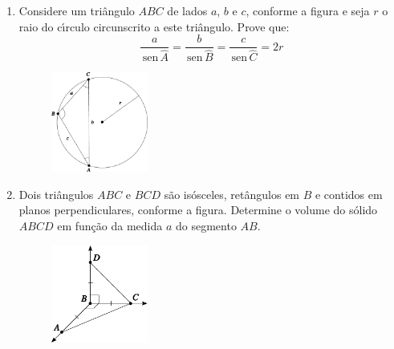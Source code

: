 \documentclass[a4paper,5pt]{amsbook}
\newcommand{\sen}{\,\mbox{sen}\,}
\begin{document}
\vspace{1cm}
\begin{enumerate}
    \item Considere um tri\^angulo $ABC$ de lados $a$, $b$ e $c$, conforme a
        figura e seja $r$ o raio do c\'{\i}rculo circunscrito a este tri\^angulo.
        Prove que:
        \[\frac{a}{\sen\hat{A}} = \frac{b}{\sen\hat{B}} = \frac{c}{\sen\hat{C}}
        = 2r\]
        \begin{figure}[!h]
            \centering
            \includegraphics[width=0.3\textwidth]{fig03-1.pdf}
        \end{figure}

    \item Dois tri\^angulos $ABC$ e $BCD$ s\~ao is\'osceles, ret\^angulos em $B$ e
        contidos em planos perpendiculares, conforme a figura. Determine o
        volume do s\'olido $ABCD$ em fun\c{c}\~ao da medida $a$ do segmento $AB$.
        \begin{figure}[!h]
            \centering
            \includegraphics[width=0.3\textwidth]{fig03-2.pdf}
        \end{figure}


\end{enumerate}
\end{document}
